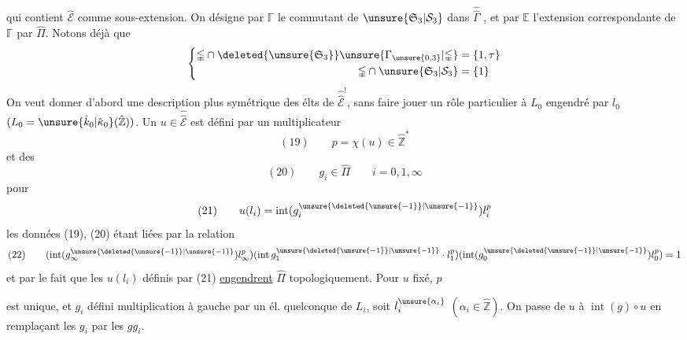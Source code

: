 qui contient $\hat{\mathcal E}$ comme sous-extension. On désigne par $\mathbb\Gamma$ le commutant de $\unsure{\mathfrak S_3|\mathcal S_3}$ dans $\widehat{\widehat\Gamma}$ , et par $\mathbb E$ l'extension correspondante de $\mathbb\Gamma$ par $\hat\Pi$. Notons déjà que
\[
\left\{\begin{aligned}
\mathbb\Gamma\cap\deleted{\unsure{\mathfrak S_3}}\unsure{\Gamma_{\unsure{0,3}}|\mathbb\Gamma}&=\{1,\tau\}\\
\mathbb\Gamma\cap\unsure{\mathfrak S_3|\mathcal S_3}&=\{1\}
\end{aligned}\right.
\]
On veut donner d'abord une description plus symétrique des élts de $\widehat{\widehat{\mathcal E}}^!$, sans faire jouer un rôle particulier à $L_0$ engendré par $l_0$ $(L_0=\unsure{\hat k_0|\hat\kappa_0}(\hat{\mathbb Z}))$. Un $u\in\widehat{\widehat{\mathcal E}}$ est  défini par un multiplicateur
\[
(19)\qquad p=\chi(u)\in\hat{\mathbb Z}^{*}
\]
et des
\[
(20)\qquad g_i\in\hat\Pi\qquad i=0,1,\infty
\]
pour
\[
(21)\qquad u(l_i)=\operatorname{int}(g_i^{\unsure{\deleted{\unsure{-1}}|\unsure{-1}}})l_i^p
\]
les données (19), (20) étant liées par la relation
\[
(22)\qquad(\operatorname{int}(g_\infty^{\unsure{\deleted{\unsure{-1}}|\unsure{-1}}})l_\infty^p)
(\operatorname{int}g_1^{\unsure{\deleted{\unsure{-1}}|\unsure{-1}}}\cdot l_1^p)
(\operatorname{int}(g_0^{\unsure{\deleted{\unsure{-1}}|\unsure{-1}}})l_0^p)=1
\]
et par le fait que les $u(l_i)$ définis par (21) \uline{engendrent} $\hat\Pi$ topologiquement. Pour $u$ fixé, $p$

est unique, et $g_i$ défini multiplication à gauche par un él. quelconque de $L_i$, soit $l_i^{\unsure{\alpha_i}}$ $(\alpha_i\in\hat{\mathbb Z})$. On passe de $u$ à $\operatorname{int}(g)\circ u$ en  remplaçant les $g_i$ par les $gg_i$.

